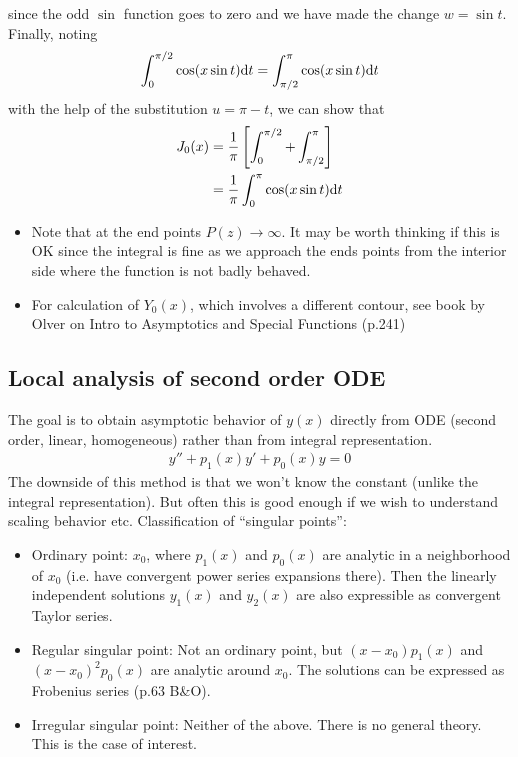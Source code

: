 since the odd $\sin$ function goes to zero and we have made the change $w = \sin t$. Finally, noting 
\begin{gather*}
	\int_{0}^{\pi/2} \cos (x \sin t) \mathrm{d} t = \int_{\pi/2}^{\pi} \cos (x \sin t) \mathrm{d} t
\end{gather*}
with the help of the substitution $u = \pi - t$, we can show that
\begin{align*}
	J_0(x) &= \frac{1}{\pi} \left[\int_{0}^{\pi/2} + \int_{\pi/2}^{\pi}\right] \\
	&= \frac{1}{\pi} \int_{0}^{\pi} \cos (x \sin t) \mathrm{d} t
\end{align*}
\begin{itemize}
	\item Note that at the end points $P(z) \rightarrow \infty$. It may be worth thinking if this is OK since the integral is fine as we approach the ends points from the interior side where the function is not badly behaved.
	\item For calculation of $Y_0(x)$, which involves a different contour, see book by Olver on Intro to Asymptotics and Special Functions (p.241)
\end{itemize}

\subsection*{Local analysis of second order ODE}
The goal is to obtain asymptotic behavior of $y(x)$ directly from ODE (second order, linear, homogeneous) rather than from integral representation. 
\begin{gather*}
	y'' + p_1(x) y' + p_0(x) y = 0
\end{gather*}
The downside of this method is that we won't know the constant (unlike the integral representation). But often this is good enough if we wish to understand scaling behavior etc. Classification of ``singular points'':
\begin{itemize}
	\item Ordinary point: $x_0$, where $p_1(x)$ and $p_0(x)$ are analytic in a neighborhood of $x_0$ (i.e. have convergent power series expansions there). Then the linearly independent solutions $y_1(x)$ and $y_2(x)$ are also expressible as convergent Taylor series.
	\item Regular singular point: Not an ordinary point, but $(x-x_0)p_1(x)$ and $(x-x_0)^2 p_0(x)$ are analytic around $x_0$. The solutions can be expressed as Frobenius series (p.63 B\&O). 
	\item Irregular singular point: Neither of the above. There is no general theory. This is the case of interest.
\end{itemize}
